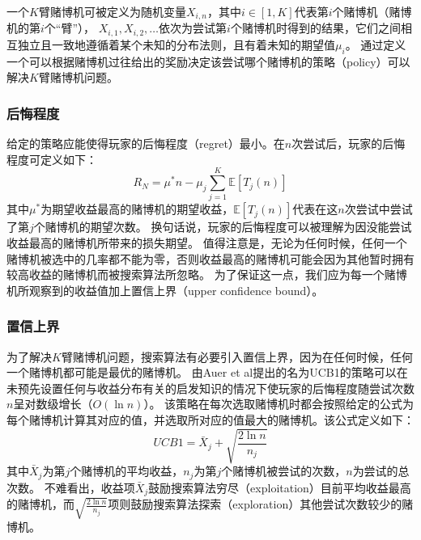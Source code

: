 一个$K$臂赌博机可被定义为随机变量$X_{i,n}$，其中$i \in [1, K]$代表第$i$个赌博机（赌博机的第$i$个“臂”）\cite{auer2002finite,kocsis2006bandit,kocsis2006improved}，
$X_{i,1}, X_{i,2}, \ldots$依次为尝试第$i$个赌博机时得到的结果，它们之间相互独立且一致地遵循着某个未知的分布法则，且有着未知的期望值$\mu _{i}$。
通过定义一个可以根据赌博机过往给出的奖励决定该尝试哪个赌博机的策略（policy）可以解决$K$臂赌博机问题。

\subsubsection{后悔程度}
\label{section:reget}

给定的策略应能使得玩家的后悔程度（regret）最小。在$n$次尝试后，玩家的后悔程度可定义如下：
\begin{equation}
R_N = \mu ^* n - \mu _j \sum_{j=1}^K\mathbb{E}[T_j(n)]
\end{equation}
其中$\mu ^*$为期望收益最高的赌博机的期望收益，$\mathbb{E}[T_j(n)]$代表在这$n$次尝试中尝试了第$j$个赌博机的期望次数。
换句话说，玩家的后悔程度可以被理解为因没能尝试收益最高的赌博机所带来的损失期望。
值得注意是，无论为任何时候，任何一个赌博机被选中的几率都不能为零，否则收益最高的赌博机可能会因为其他暂时拥有较高收益的赌博机而被搜索算法所忽略。
为了保证这一点，我们应为每一个赌博机所观察到的收益值加上置信上界（upper confidence bound）。

\subsubsection{置信上界}
\label{section:UpperConfidenceBound}

为了解决$K$臂赌博机问题，搜索算法有必要引入置信上界，因为在任何时候，任何一个赌博机都可能是最优的赌博机。
由Auer et al提出的名为UCB1的策略\cite{auer2002finite}可以在未预先设置任何与收益分布有关的启发知识的情况下使玩家的后悔程度随尝试次数$n$呈对数级增长（$O(\ln n)$）。
该策略在每次选取赌博机时都会按照给定的公式为每个赌博机计算其对应的值，并选取所对应的值最大的赌博机。该公式定义如下：
\begin{equation}
UCB1 = \bar{X}_j + \sqrt{\frac{2\ln n}{n_j}}
\end{equation}
其中$\bar{X}_j$为第$j$个赌博机的平均收益，$n_j$为第$j$个赌博机被尝试的次数，$n$为尝试的总次数。
不难看出，收益项$\bar{X}_j$鼓励搜索算法穷尽（exploitation）目前平均收益最高的赌博机，而$\sqrt{\frac{2\ln n}{n_j}}$项则鼓励搜索算法探索（exploration）其他尝试次数较少的赌博机。
